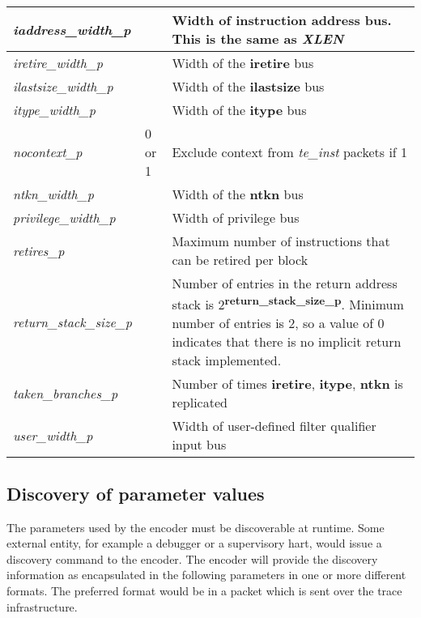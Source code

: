 \begin{table}[h]
\begin{tabulary}{\textwidth}{|l|p{25mm}|p{80mm}|}
        \hline
        \textit{iaddress\_width\_p} & & Width of instruction address bus. This is the same as \textit{XLEN}\\
        \hline
        \textit{iretire\_width\_p} & & Width of the \textbf{iretire} bus\\
        \hline
        \textit{ilastsize\_width\_p} & & Width of the \textbf{ilastsize} bus\\
        \hline
        \textit{itype\_width\_p} & & Width of the \textbf{itype} bus\\
        \hline
        \textit{nocontext\_p} & 0 or 1 & Exclude context from \textit{te\_inst} packets if 1 \\
        \hline
        \textit{ntkn\_width\_p} & & Width of the \textbf{ntkn} bus\\
        \hline
        \textit{privilege\_width\_p} & & Width of privilege bus \\
        \hline
        \textit{retires\_p} &  & Maximum number of instructions that can be retired per block \\
        \hline
        \textit{return\_stack\_size\_p} &  & Number of entries in the return address stack is 2\textsuperscript{\textbf{return\_stack\_size\_p}}.
                                    Minimum number of entries is 2, so a value of 0 indicates that there is no implicit return stack implemented.\\
        \hline
        \textit{taken\_branches\_p} & & Number of times \textbf{iretire}, \textbf{itype}, \textbf{ntkn} is replicated\\
        \hline
        \textit{user\_width\_p} & & Width of user-defined filter qualifier input bus \\
        \hline
    \end{tabulary}
\end{table}
\FloatBarrier

\subsection {Discovery of parameter values}

The parameters used by the encoder must be discoverable at
runtime. Some external entity, for example a debugger or a supervisory
hart, would issue a discovery command to the encoder. The encoder will
provide the discovery information as encapsulated in the following
parameters in one or more different formats.  The preferred format
would be in a packet which is sent over the trace infrastructure.

